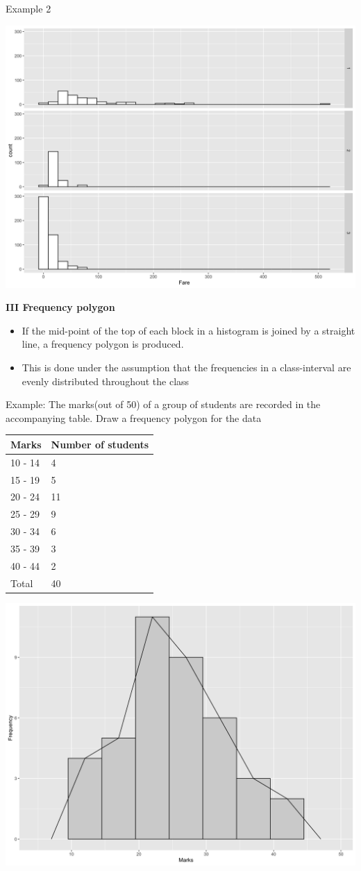 \documentclass[]{book}
\providecommand{\tightlist}{%
  \setlength{\itemsep}{0pt}\setlength{\parskip}{0pt}}
\begin{document}
Example 2

\begin{center}\includegraphics[width=0.8\linewidth]{figure/box18-1} \end{center}

\textbf{III Frequency polygon}

\begin{itemize}
\tightlist
\item
  If the mid-point of the top of each block in a histogram is joined by a straight line, a frequency polygon is produced.
\item
  This is done under the assumption that the frequencies in a class-interval are evenly distributed throughout the class
\end{itemize}

Example: The marks(out of 50) of a group of students are recorded in the accompanying table. Draw a frequency polygon for the data

\begin{longtable}[]{@{}ll@{}}
\toprule
Marks & Number of students\tabularnewline
\midrule
\endhead
10 - 14 & 4\tabularnewline
15 - 19 & 5\tabularnewline
20 - 24 & 11\tabularnewline
25 - 29 & 9\tabularnewline
30 - 34 & 6\tabularnewline
35 - 39 & 3\tabularnewline
40 - 44 & 2\tabularnewline
Total & 40\tabularnewline
\bottomrule
\end{longtable}

\begin{center}\includegraphics[width=0.8\linewidth]{figure/hist2-1} \end{center}
\end{document}

